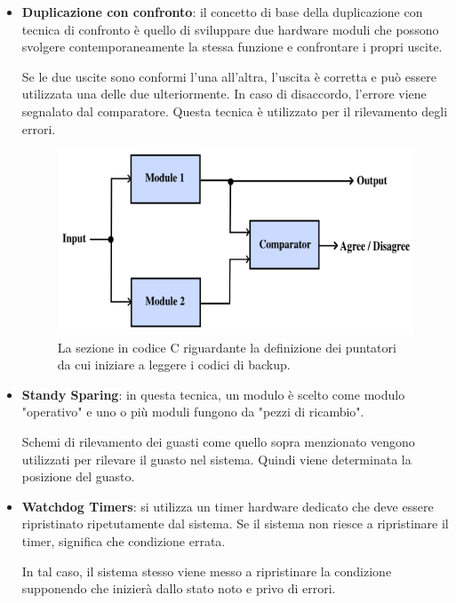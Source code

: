 \documentclass[LaM,binding=0.6cm]{../sapthesis}
\begin{document}
\begin{itemize}
    \item \textbf{Duplicazione con confronto}: il concetto di base della duplicazione con tecnica di confronto è quello di sviluppare due hardware
    moduli che possono svolgere contemporaneamente la stessa funzione e confrontare i propri
    uscite.
    
    Se le due uscite sono conformi l'una all'altra, l'uscita è corretta e può essere utilizzata una delle due ulteriormente. In caso di disaccordo, l'errore viene segnalato dal comparatore. Questa tecnica è
    utilizzato per il rilevamento degli errori.
    \begin{figure}[htbp]
    \centerline{\includegraphics[scale=.67]{examples/ActiveComparator.PNG}}
    \caption{La sezione in codice C riguardante la definizione dei puntatori da cui iniziare a leggere i codici di backup.}
    \label{fig}
    \end{figure}
\newline
    
    \item \textbf{Standy Sparing}: in questa tecnica, un modulo è scelto come modulo "operativo" e uno o più moduli fungono da "pezzi di ricambio".
    
    Schemi di rilevamento dei guasti come quello sopra menzionato vengono utilizzati per rilevare il guasto nel sistema. Quindi viene determinata la posizione del guasto. 
    
    \item \textbf{Watchdog Timers}: si utilizza un timer hardware dedicato che deve essere ripristinato ripetutamente dal sistema. Se il sistema non riesce a ripristinare il timer, significa che condizione errata.
    
    In tal caso, il sistema stesso viene messo a ripristinare la condizione supponendo che
    inizierà dallo stato noto e privo di errori.
    
\end{itemize}
\end{document}

